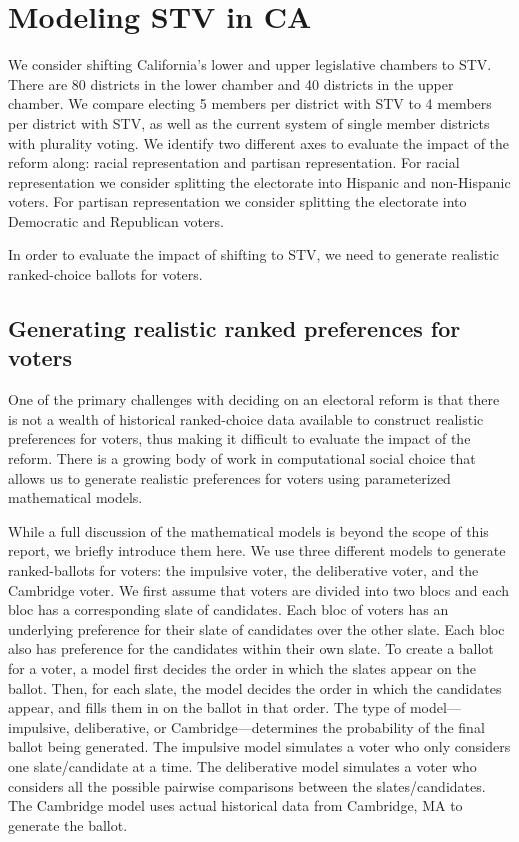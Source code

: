 \documentclass{amsart}
\theoremstyle{definition}
\begin{document}
\section{Modeling STV in CA}

We consider shifting California's lower and upper legislative chambers to STV.
There are 80 districts in the lower chamber and 40 districts in the upper chamber.
We compare electing 5 members per district with STV to 4 members per district with STV, 
as well as the current system of single member districts with plurality voting.  
We identify two different axes to evaluate the impact of the reform along: racial 
representation and partisan representation.
For racial representation we consider splitting the electorate into Hispanic and non-Hispanic voters.
For partisan representation we consider splitting the electorate into Democratic and Republican voters.


In order to evaluate the impact of shifting to STV, we need to generate realistic ranked-choice ballots for voters.

\subsection{Generating realistic ranked preferences for voters}
One of the primary challenges with deciding on an electoral reform is that there is not a wealth of 
historical ranked-choice data available to construct realistic preferences for voters, thus making
it difficult to evaluate the impact of the reform. There is a growing body of work in 
computational social choice that allows us to generate realistic preferences for voters 
using parameterized mathematical models. 

While a full discussion of the mathematical models is beyond the scope of this report, we briefly introduce them here. 
We use three different models to generate ranked-ballots 
for voters: the impulsive voter, the deliberative voter, and the Cambridge voter.
We first assume that voters are divided into two blocs and each bloc has a corresponding slate of candidates.
Each bloc of voters has an underlying preference for their slate of candidates over the other slate.
Each bloc also has preference for the candidates within their own slate.
To create a ballot for a voter, a model first decides the order in which the slates appear on the ballot.
Then, for each slate, the model decides the order in which the candidates appear, and fills them 
in on the ballot in that order.
The type of model---impulsive, deliberative, or Cambridge---determines the probability of 
the final ballot being generated.
The impulsive model simulates a voter who only considers one slate/candidate at a time.
The deliberative model simulates a voter who considers all the possible pairwise comparisons 
between the slates/candidates.
The Cambridge model uses actual historical data from Cambridge, MA to generate the ballot.
\end{document}
